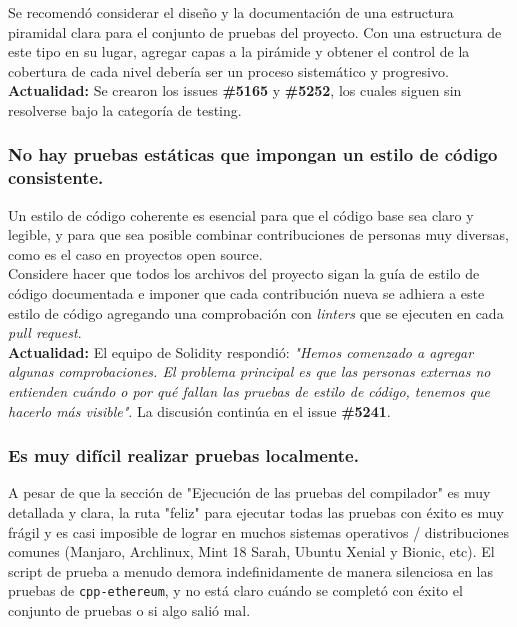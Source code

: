 Se recomendó considerar el diseño y la documentación de una estructura piramidal clara para el conjunto de pruebas del proyecto. Con una estructura de este tipo en su lugar, agregar capas a la pirámide y obtener el control de la cobertura de cada nivel debería ser un proceso sistemático y progresivo.\\

\textbf{Actualidad: }Se crearon los issues \textbf{\#5165}\cite{GHI5165} y \textbf{\#5252}\cite{GHI5252}, los cuales siguen sin resolverse bajo la categoría de testing.\\

\subsubsection{No hay pruebas estáticas que impongan un estilo de código consistente.}

Un estilo de código coherente es esencial para que el código base sea claro y legible, y para que sea posible combinar contribuciones de personas muy diversas, como es el caso en proyectos open source.\\

Considere hacer que todos los archivos del proyecto sigan la guía de estilo de código documentada\cite{SolidityStyleGuide} e imponer que cada contribución nueva se adhiera a este estilo de código agregando una comprobación con \textit{linters} que se ejecuten en cada \textit{pull request}.\\

\textbf{Actualidad:} El equipo de Solidity respondió: \textit{"Hemos comenzado a agregar algunas comprobaciones. El problema principal es que las personas externas no entienden cuándo o por qué fallan las pruebas de estilo de código, tenemos que hacerlo más visible"}. La discusión continúa en el issue \textbf{\#5241\cite{GHI5241}}.\\

\subsubsection{Es muy difícil realizar pruebas localmente.}
A pesar de que la sección de "Ejecución de las pruebas del compilador"\cite{SolidityContributingTests} es muy detallada y clara, la ruta "feliz" para ejecutar todas las pruebas con éxito es muy frágil y es casi imposible de lograr en muchos sistemas operativos / distribuciones comunes (Manjaro, Archlinux, Mint 18 Sarah, Ubuntu Xenial y Bionic, etc). El script de prueba a menudo demora indefinidamente de manera silenciosa en las pruebas de \verb|cpp-ethereum|, y no está claro cuándo se completó con éxito el conjunto de pruebas o si algo salió mal.\\


